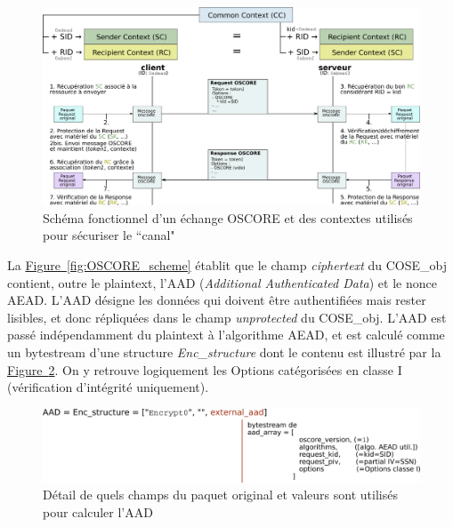 \documentclass[]{report}
\newcommand{\wordlink}[2]{\hyperref[#2]{#1~\ref{#2}}}
\begin{document}
	\begin{figure}[!ht]
	\centering
	\includegraphics[width=0.9\linewidth]{OSCORE_contexts}
	\caption{Schéma fonctionnel d'un échange OSCORE et des contextes utilisés pour sécuriser le ``canal"}
	\label{fig:OSCORE_contexts}
	\end{figure}


\newpage

La \wordlink{Figure}{fig:OSCORE_scheme} établit que le champ \textit{ciphertext} du COSE\_obj contient, outre le plaintext, l'AAD (\textit{Additional Authenticated Data}) et le nonce AEAD. L'AAD désigne les données qui doivent être authentifiées mais rester lisibles, et donc répliquées dans le champ \textit{unprotected} du COSE\_obj. L'AAD est passé indépendamment du plaintext à l'algorithme AEAD, et est calculé comme un bytestream d'une structure \textit{Enc\_structure} \cite{rfc8152} dont le contenu est illustré par la \wordlink{Figure}{fig:OSCORE_AAD}. On y retrouve logiquement les Options catégorisées en classe I (vérification d'intégrité uniquement).
 
\vspace{0.2cm}
	\begin{figure}[!h]
	\centering
	\includegraphics[width=0.95\linewidth]{OSCORE_AAD}
	\caption{Détail de quels champs du paquet original et valeurs sont utilisés pour calculer l'AAD}
	\label{fig:OSCORE_AAD}
	\end{figure}
 
\vspace{0.4cm}
 
\end{document}

